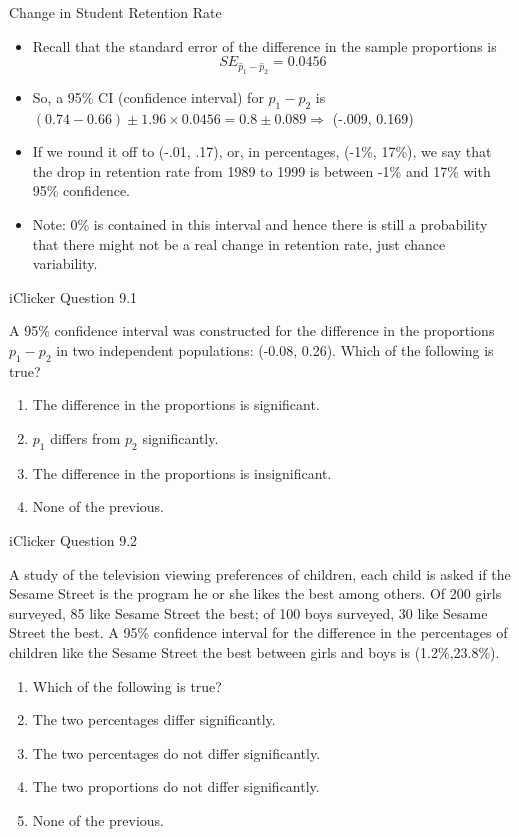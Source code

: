 \documentclass[14pt]{beamer}\usepackage[]{graphicx}\usepackage[]{color}
\begin{document}
\begin{frame}[fragile]{Change in Student Retention Rate}

{\small{
\begin{itemize}
\item<1-> Recall that the standard error of the difference in the sample  proportions is
$$SE_{\hat{p}_1 - \hat{p}_2} = 0.0456$$
\item<2-> So, a 95\% CI (confidence interval) for $p_1 - p_2$ is
$(0.74 - 0.66) \pm 1.96 \times 0.0456 = 0.8 \pm 0.089 \Rightarrow$ (-.009, 0.169) 
\item<3-> If we round it off to (-.01, .17), or, in percentages, (-1\%, 17\%), we say  that the drop in retention rate from 1989 to 1999 is between -1\% and  17\% with 95\% confidence. 
\item<4-> Note: 0\% is contained in this interval and  hence there is still a probability that there might not be a real change in retention rate, just chance variability.
\end{itemize}
}}
\end{frame}

\begin{frame}[fragile]{iClicker Question 9.1}

A 95\% confidence interval was constructed for the difference in the  proportions $p_1 - p_2$ in two independent populations: (-0.08, 0.26).  Which of the following is true?

\begin{enumerate}
\item The difference in the proportions is significant.
\item $p_1$  differs from $p_2$ significantly.
\item The difference in the proportions is insignificant.
\item None of the previous.
\end{enumerate}

\end{frame}

\begin{frame}[fragile]{iClicker Question 9.2}

{\small{
A study of the television viewing preferences of children, each child is  asked if the Sesame Street is the program he or she likes the best  among others. Of 200 girls surveyed, 85 like Sesame Street the best;  of 100 boys surveyed, 30 like Sesame Street the best. A 95\%  confidence interval for the difference in the percentages of children like  the Sesame Street the best between girls and boys is (1.2\%,23.8\%).

\begin{enumerate}
\item Which of the following is true?
\item The two percentages differ significantly.
\item The two percentages do not differ significantly.
\item The two proportions do not differ significantly.
\item None of the previous.
\end{enumerate}
}}
\end{frame}
\end{document}
